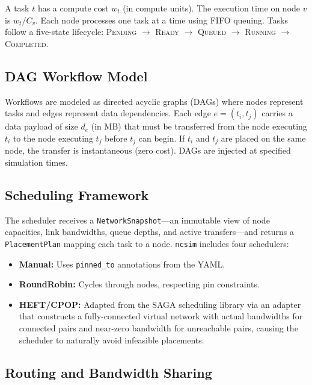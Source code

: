 \documentclass[conference]{IEEEtran}
\newcommand{\ncsim}{\texttt{ncsim}}
\begin{document}
A task $t$ has a compute cost $w_t$ (in compute units).  The execution time
on node $v$ is $w_t / C_v$.  Each node processes one task at a time using
FIFO queuing.  Tasks follow a five-state lifecycle: \textsc{Pending}
$\rightarrow$ \textsc{Ready} $\rightarrow$ \textsc{Queued} $\rightarrow$
\textsc{Running} $\rightarrow$ \textsc{Completed}.

\subsection{DAG Workflow Model}

Workflows are modeled as directed acyclic graphs (DAGs) where nodes represent
tasks and edges represent data dependencies.  Each edge $e = (t_i, t_j)$
carries a data payload of size $d_e$ (in MB) that must be transferred from
the node executing $t_i$ to the node executing $t_j$ before $t_j$ can begin.
If $t_i$ and $t_j$ are placed on the same node, the transfer is
instantaneous (zero cost).  DAGs are injected at specified simulation times.

\subsection{Scheduling Framework}

The scheduler receives a \texttt{NetworkSnapshot}---an immutable view of
node capacities, link bandwidths, queue depths, and active transfers---and
returns a \texttt{PlacementPlan} mapping each task to a node.  \ncsim{}
includes four schedulers:

\begin{itemize}[itemsep=1pt,leftmargin=*]
\item \textbf{Manual:} Uses \texttt{pinned\_to} annotations from the YAML.
\item \textbf{RoundRobin:} Cycles through nodes, respecting pin constraints.
\item \textbf{HEFT/CPOP:} Adapted from the SAGA scheduling library via an
  adapter that constructs a fully-connected virtual network with actual
  bandwidths for connected pairs and near-zero bandwidth for unreachable
  pairs, causing the scheduler to naturally avoid infeasible placements.
\end{itemize}

\subsection{Routing and Bandwidth Sharing}
\end{document}
